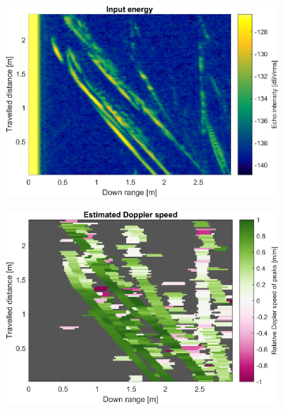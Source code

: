 \begin{figure}[htbp]
    \centering
    \begin{subfigure}[t]{0.475\linewidth}
        \centering
        \includegraphics[width=\linewidth,max height=.475\textheight]{gfx/results/garden_input.png}
    \end{subfigure}%
    \hfill%
    \begin{subfigure}[t]{0.475\linewidth}
        \centering
        \includegraphics[width=\linewidth,max height=.475\textheight]{gfx/results/garden_doppler.png}
    \end{subfigure}\bigskip\\
    \begin{subfigure}[t]{0.5\linewidth}
        \centering

\end{subfigure}
\end{figure}
